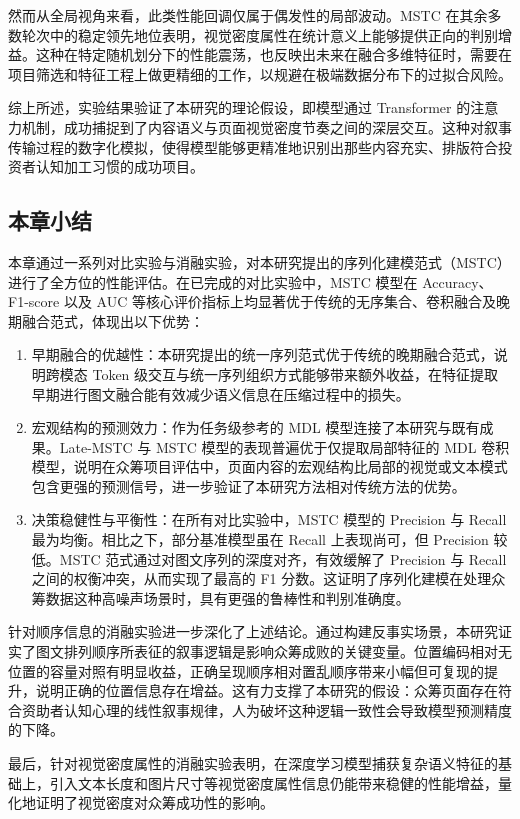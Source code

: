 然而从全局视角来看，此类性能回调仅属于偶发性的局部波动。MSTC 在其余多数轮次中的稳定领先地位表明，视觉密度属性在统计意义上能够提供正向的判别增益。这种在特定随机划分下的性能震荡，也反映出未来在融合多维特征时，需要在项目筛选和特征工程上做更精细的工作，以规避在极端数据分布下的过拟合风险。

综上所述，实验结果验证了本研究的理论假设，即模型通过 Transformer 的注意力机制，成功捕捉到了内容语义与页面视觉密度节奏之间的深层交互。这种对叙事传输过程的数字化模拟，使得模型能够更精准地识别出那些内容充实、排版符合投资者认知加工习惯的成功项目。

\subsection{本章小结}
本章通过一系列对比实验与消融实验，对本研究提出的序列化建模范式（MSTC）进行了全方位的性能评估。在已完成的对比实验中，MSTC 模型在 Accuracy、F1-score 以及 AUC 等核心评价指标上均显著优于传统的无序集合、卷积融合及晚期融合范式，体现出以下优势：

\begin{enumerate}[label=(\arabic*)]
  \item 早期融合的优越性：本研究提出的统一序列范式优于传统的晚期融合范式，说明跨模态 Token 级交互与统一序列组织方式能够带来额外收益，在特征提取早期进行图文融合能有效减少语义信息在压缩过程中的损失。
  \item 宏观结构的预测效力：作为任务级参考的 MDL 模型连接了本研究与既有成果。Late-MSTC 与 MSTC 模型的表现普遍优于仅提取局部特征的 MDL 卷积模型，说明在众筹项目评估中，页面内容的宏观结构比局部的视觉或文本模式包含更强的预测信号，进一步验证了本研究方法相对传统方法的优势。
  \item 决策稳健性与平衡性：在所有对比实验中，MSTC 模型的 Precision 与 Recall 最为均衡。相比之下，部分基准模型虽在 Recall 上表现尚可，但 Precision 较低。MSTC 范式通过对图文序列的深度对齐，有效缓解了 Precision 与 Recall 之间的权衡冲突，从而实现了最高的 F1 分数。这证明了序列化建模在处理众筹数据这种高噪声场景时，具有更强的鲁棒性和判别准确度。
\end{enumerate}

针对顺序信息的消融实验进一步深化了上述结论。通过构建反事实场景，本研究证实了图文排列顺序所表征的叙事逻辑是影响众筹成败的关键变量。位置编码相对无位置的容量对照有明显收益，正确呈现顺序相对置乱顺序带来小幅但可复现的提升，说明正确的位置信息存在增益。这有力支撑了本研究的假设：众筹页面存在符合资助者认知心理的线性叙事规律，人为破坏这种逻辑一致性会导致模型预测精度的下降。

最后，针对视觉密度属性的消融实验表明，在深度学习模型捕获复杂语义特征的基础上，引入文本长度和图片尺寸等视觉密度属性信息仍能带来稳健的性能增益，量化地证明了视觉密度对众筹成功性的影响。
